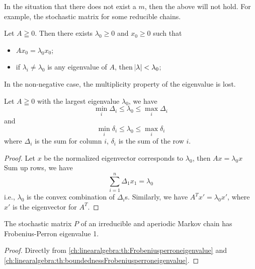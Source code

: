 \begin{refsection}
\begin{remark}
In the situation that there does not exist a $m$, then the above will not hold. For example, the stochastic matrix for some reducible chains.
\end{remark}

\begin{theorem}
\cite[193]{luenberger1979introduction}Let $A \geqq 0$. Then there exists $\lambda_0 \geq 0$ and $x_0 \geq 0$ such that \begin{itemize}
    \item $Ax_0 = \lambda_0 x_0$;
    \item if $\lambda_i \neq \lambda_0$ is any eigenvalue of $A$, then $\abs{\lambda} < \lambda_0$;
\end{itemize} 
\end{theorem}

\begin{remark}
In the non-negative case, the multiplicity property of the eigenvalue is lost. 
\end{remark}

\begin{theorem}\label{ch:linearalgebra:th:boundednessFrobeniusperroneigenvalue}
Let $A \geqq 0$ with the largest eigenvalue $\lambda_0$, we have
$$\min_i \Delta_i \leq \lambda_0 \leq \max_i \Delta_i$$
and
$$\min_i \delta_i \leq \lambda_0 \leq \max_i \delta_i$$
where $\Delta_i$ is the sum for column $i$, $\delta_i$ is the sum of the row $i$. 
\end{theorem}
\begin{proof}
Let $x$ be the normalized eigenvector corresponds to $\lambda_0$, then $Ax = \lambda_0 x$
Sum up rows, we have $$\sum_{i=1}^n\Delta_1 x_1 = \lambda_0$$ i.e., $\lambda_0$ is the convex combination of $\Delta_i$s. 
Similarly, we have $A^Tx'=\lambda_0 x'$, where $x'$ is the eigenvector for $A^T$.	
\end{proof}



\begin{corollary}
The stochastic matrix $P$ of an irreducible and aperiodic Markov chain has Frobenius-Perron eigenvalue 1.		
\end{corollary}
\begin{proof}
Directly from \autoref{ch:linearalgebra:th:Frobeniusperroneigenvalue} and \autoref{ch:linearalgebra:th:boundednessFrobeniusperroneigenvalue}.
\end{proof}



\end{refsection}
